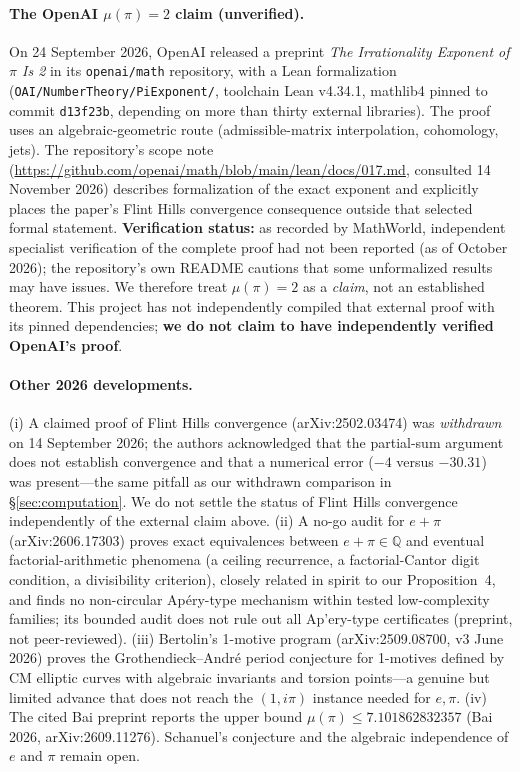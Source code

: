 \documentclass[11pt]{amsart}
\theoremstyle{definition}
\theoremstyle{remark}
\numberwithin{equation}{section}
\newcommand{\Q}{\mathbb{Q}}
\newcommand{\irr}{\mu}
\begin{document}
\paragraph{The OpenAI $\irr(\pi)=2$ claim (unverified).} On 24 September 2026, OpenAI released a preprint \emph{The Irrationality Exponent of $\pi$ Is 2} in its \texttt{openai/\allowbreak{}math} repository, with a Lean formalization (\texttt{OAI/\allowbreak{}NumberTheory/\allowbreak{}PiExponent/\allowbreak{}}, toolchain Lean v4.34.1, mathlib4 pinned to commit \texttt{d13f23b}, depending on more than thirty external libraries). The proof uses an algebraic-geometric route (admissible-matrix interpolation, cohomology, jets). The repository's scope note (\url{https://github.com/openai/math/blob/main/lean/docs/017.md}, consulted 14 November 2026) describes formalization of the exact exponent and explicitly places the paper's Flint Hills convergence consequence outside that selected formal statement. \textbf{Verification status:} as recorded by MathWorld, independent specialist verification of the complete proof had not been reported (as of October 2026); the repository's own README cautions that some unformalized results may have issues. We therefore treat $\irr(\pi)=2$ as a \emph{claim}, not an established theorem. This project has not independently compiled that external proof with its pinned dependencies; \textbf{we do not claim to have independently verified OpenAI's proof}.

\paragraph{Other 2026 developments.} (i) A claimed proof of Flint Hills convergence (arXiv:2502.03474) was \emph{withdrawn} on 14 September 2026; the authors acknowledged that the partial-sum argument does not establish convergence and that a numerical error ($-4$ versus $-30.31$) was present---the same pitfall as our withdrawn comparison in \S\ref{sec:computation}. We do not settle the status of Flint Hills convergence independently of the external claim above. (ii) A no-go audit for $e+\pi$ (arXiv:2606.17303) proves exact equivalences between $e+\pi\in\Q$ and eventual factorial-arithmetic phenomena (a ceiling recurrence, a factorial-Cantor digit condition, a divisibility criterion), closely related in spirit to our Proposition~4, and finds no non-circular Ap\'ery-type mechanism within tested low-complexity families; its bounded audit does not rule out all Ap'ery-type certificates (preprint, not peer-reviewed). (iii) Bertolin's 1-motive program (arXiv:2509.08700, v3 June 2026) \cite{BertolinMotives} proves the Grothendieck--Andr\'e period conjecture for 1-motives defined by CM elliptic curves with algebraic invariants and torsion points---a genuine but limited advance that does not reach the $(1,i\pi)$ instance needed for $e,\pi$. (iv) The cited Bai preprint reports the upper bound $\irr(\pi)\le 7.101862832357$ (Bai 2026, arXiv:2609.11276). Schanuel's conjecture and the algebraic independence of $e$ and $\pi$ remain open.
\end{document}
